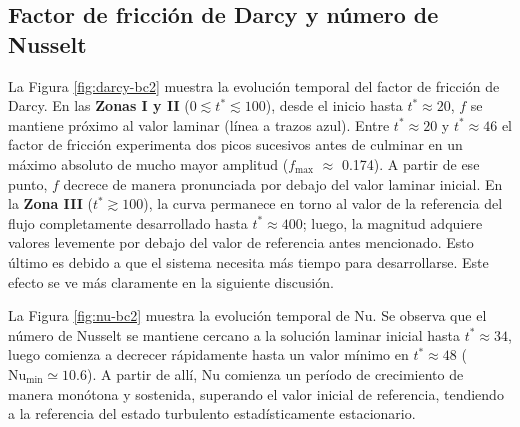 \subsection{Factor de fricción de Darcy y número de Nusselt}
La Figura \ref{fig:darcy-bc2} muestra la evolución temporal del factor de fricción de Darcy. En las \textbf{Zonas I y II} ($0 \lesssim t^* \lesssim 100$), desde el inicio hasta $t^* \approx 20$, $f$ se mantiene próximo al valor laminar (línea a trazos azul). Entre $t^* \approx 20$ y $t^* \approx 46$ el factor de fricción experimenta dos picos sucesivos antes de culminar en un máximo absoluto de mucho mayor amplitud \linebreak ($f_{\max}$ $\approx$ 0.174). A partir de ese punto, $f$ decrece de manera pronunciada por debajo del valor \linebreak laminar inicial. En la \textbf{Zona III} ($t^* \gtrsim 100$), la curva permanece en torno al valor de la referencia del flujo completamente desarrollado hasta $t^* \approx 400$; luego, la magnitud adquiere valores levemente por debajo del valor de referencia antes mencionado. Esto último es debido a que el sistema necesita más tiempo para desarrollarse. Este efecto se ve más claramente en la siguiente discusión.

La Figura \ref{fig:nu-bc2} muestra la evolución temporal de Nu. Se observa que el número de Nusselt se mantiene cercano a la solución laminar inicial hasta $t^* \approx 34$, luego comienza a decrecer rápidamente hasta un valor mínimo en $t^* \approx 48$ ($\text{Nu}_{\text{min}} \simeq 10\text{.}6$). A partir de allí, Nu comienza un período de crecimiento de manera monótona y sostenida, superando el valor inicial de referencia, tendiendo a la referencia del estado turbulento estadísticamente estacionario. 

\newpage

